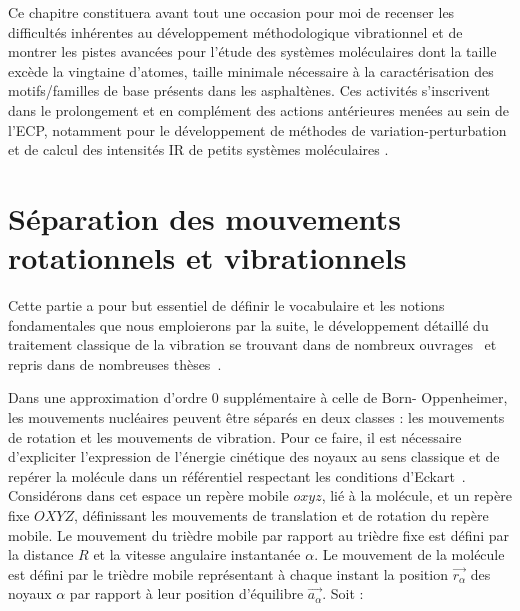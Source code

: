 Ce chapitre constituera avant tout une occasion pour moi de recenser les difficultés inhérentes au développement méthodologique vibrationnel et de montrer les pistes avancées pour l'étude des systèmes moléculaires dont la taille excède la vingtaine d'atomes, taille minimale nécessaire à la caractérisation des motifs/familles de base présents dans les asphaltènes. Ces activités s’inscrivent dans le prolongement et en complément des actions antérieures menées au sein de l'ECP, notamment pour le développement de méthodes de variation-perturbation et de calcul des intensités IR de petits systèmes moléculaires \cite{krusic1991electron}. 



\section[Séparation des mouvements]{Séparation des mouvements rotationnels et vibrationnels}

Cette partie a pour but essentiel de définir le vocabulaire et les notions fondamentales que nous emploierons par la suite, le développement détaillé du traitement classique de la vibration se trouvant dans de nombreux ouvrages~\cite{barchewitz1971spectroscopie,wilson1955molecular} et repris dans de nombreuses thèses~\cite{pouchan1978approche,zaki1996etude}.

Dans une approximation d'ordre 0 supplémentaire à celle de Born- Oppenheimer, les mouvements nucléaires peuvent être séparés en deux classes : les mouvements de rotation et les mouvements de vibration.
Pour ce faire, il est nécessaire d'expliciter l'expression de l'énergie cinétique des noyaux au sens classique et de repérer la molécule dans un référentiel respectant les conditions d'Eckart~\cite{eckart1935some}.
Considérons dans cet espace un repère mobile $oxyz$, lié à la molécule, et un repère fixe $OXYZ$, définissant les mouvements de translation et de rotation du repère mobile. Le mouvement du trièdre mobile par rapport au trièdre fixe est défini par la distance $R$ et la vitesse angulaire instantanée $\alpha$.
Le mouvement de la molécule est défini par le trièdre mobile représentant à chaque instant la position $\stackrel{\rightarrow}{r_{\alpha}}$ des noyaux $\alpha$ par rapport à leur position d'équilibre $\stackrel{\rightarrow}{a_{\alpha}}$. Soit : 

